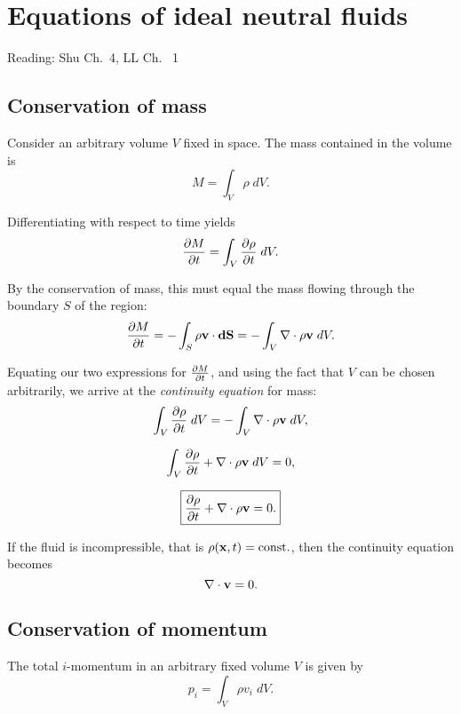 \documentclass[../ay202_class_notes.tex]{subfiles}
\begin{document}
\section{Equations of ideal neutral fluids}\label{s.ideal_gas_equations}
Reading: Shu Ch.~4, LL Ch.~ 1

\subsection{Conservation of mass}
Consider an arbitrary volume $V$ fixed in space.  The mass contained in the volume is 
\begin{equation}
M = \int_V \rho \;dV.
\end{equation}

\noindent Differentiating with respect to time yields 
\begin{equation}
\frac{\partial M}{\partial t} = \int_V \frac{\partial \rho}{\partial t} \;dV.
\end{equation}

\noindent By the conservation of mass, this must equal the mass flowing through the boundary $S$ of the region:
\begin{equation}
\frac{\partial M}{\partial t} = - \int_{S} \rho \mathbf{v} \cdot \mathbf{dS} = - \int_{V} \nabla \cdot \rho \mathbf{v} \;dV.
\end{equation}

\noindent Equating our two expressions for $\frac{\partial M}{\partial t}$, and using the fact that $V$ can be chosen arbitrarily, we arrive at the \emph{continuity equation} for mass:
\begin{equation}
\int_V \frac{\partial \rho}{\partial t} \;dV = - \int_{V} \nabla \cdot \rho \mathbf{v} \;dV,
\end{equation}

\begin{equation}
\int_V \frac{\partial \rho}{\partial t} + \nabla \cdot \rho \mathbf{v} \;dV = 0,
\end{equation}

\begin{equation}
\boxed{\frac{\partial \rho}{\partial t} + \nabla \cdot \rho \mathbf{v} = 0.}
\end{equation}

If the fluid is incompressible, that is $\rho(\mathbf{x}, t) = \text{const.}$, then the continuity equation becomes 
\begin{equation}
\nabla \cdot \mathbf{v} = 0.
\end{equation}

\subsection{Conservation of momentum}
The total $i$-momentum in an arbitrary fixed volume $V$ is given by
\begin{equation}
p_i = \int_V \rho v_i \;dV.
\end{equation}
\end{document}
